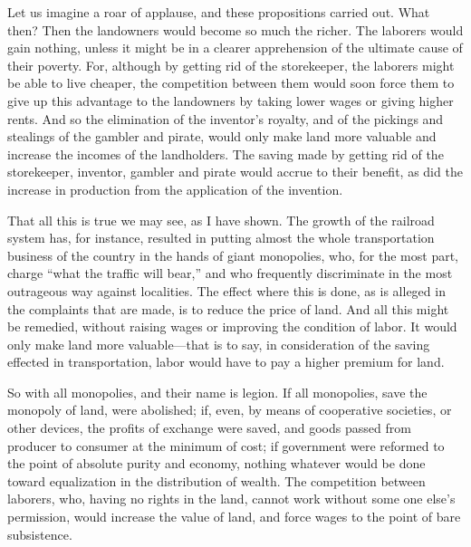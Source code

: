 \documentclass{book}
\begin{document}
Let us imagine a roar of applause, and these propositions carried out. What then? Then the landowners would become so much the richer. The laborers would gain nothing, unless it might be in a clearer apprehension of the ultimate cause of their poverty. For, although by getting rid of the storekeeper, the laborers might be able to live cheaper, the competition between them would soon force them to give up this advantage to the landowners by taking lower wages or giving higher rents. And so the elimination of the inventor’s royalty, and of the pickings and stealings of the gambler and pirate, would only make land more valuable and increase the incomes of the landholders. The saving made by getting rid of the storekeeper, inventor, gambler and pirate would accrue to their benefit, as did the increase in production from the application of the invention.

That all this is true we may see, as I have shown. The growth of the railroad system has, for instance, resulted in putting almost the whole transportation business of the country in the hands of giant monopolies, who, for the most part, charge “what the traffic will bear,” and who frequently discriminate in the most outrageous way against localities. The effect where this is done, as is alleged in the complaints that are made, is to reduce the price of land. And all this might be remedied, without raising wages or improving the condition of labor. It would only make land more valuable—that is to say, in consideration of the saving effected in transportation, labor would have to pay a higher premium for land.

So with all monopolies, and their name is legion. If all monopolies, save the monopoly of land, were abolished; if, even, by means of cooperative societies, or other devices, the profits of exchange were saved, and goods passed from producer to consumer at the minimum of cost; if government were reformed to the point of absolute purity and economy, nothing whatever would be done toward equalization in the distribution of wealth. The competition between laborers, who, having no rights in the land, cannot work without some one else’s permission, would increase the value of land, and force wages to the point of bare subsistence.
\end{document}
